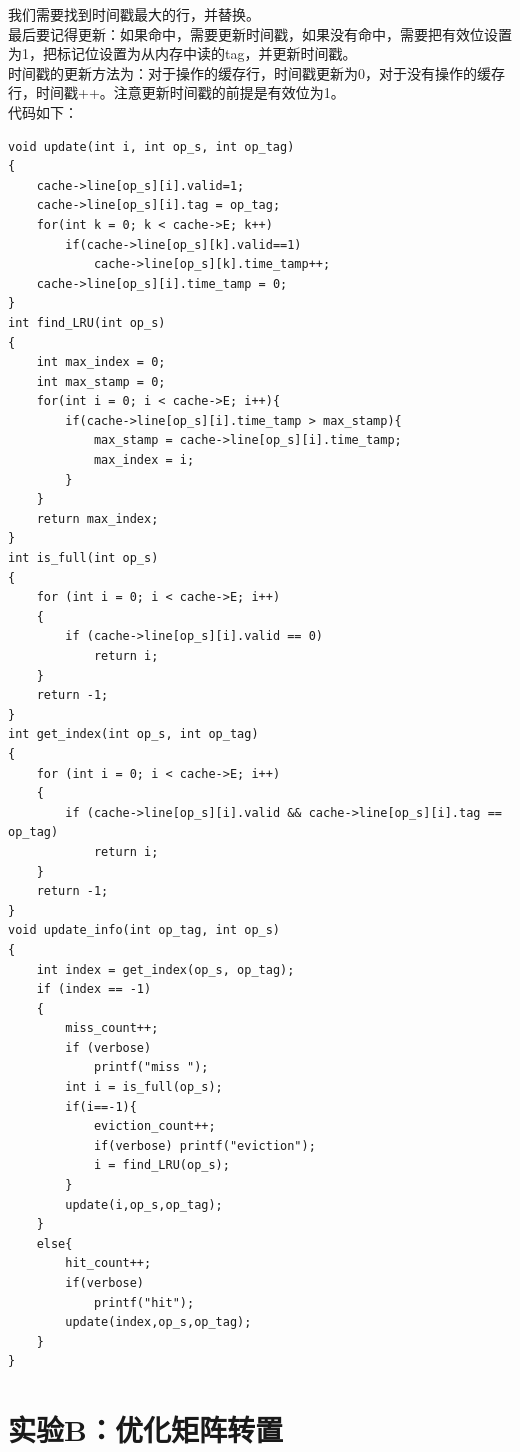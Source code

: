 \documentclass[12pt, a4paper, oneside]{ctexart}
\begin{document}
我们需要找到时间戳最大的行，并替换。\\
最后要记得更新：如果命中，需要更新时间戳，如果没有命中，需要把有效位设置为1，把标记位设置为从内存中读的tag，并更新时间戳。\\
时间戳的更新方法为：对于操作的缓存行，时间戳更新为0，对于没有操作的缓存行，时间戳++。注意更新时间戳的前提是有效位为1。\\
代码如下：
\begin{lstlisting}
void update(int i, int op_s, int op_tag)
{
    cache->line[op_s][i].valid=1;
    cache->line[op_s][i].tag = op_tag;
    for(int k = 0; k < cache->E; k++)
        if(cache->line[op_s][k].valid==1)
            cache->line[op_s][k].time_tamp++;
    cache->line[op_s][i].time_tamp = 0;
}
int find_LRU(int op_s)
{
    int max_index = 0;
    int max_stamp = 0;
    for(int i = 0; i < cache->E; i++){
        if(cache->line[op_s][i].time_tamp > max_stamp){
            max_stamp = cache->line[op_s][i].time_tamp;
            max_index = i;
        }
    }
    return max_index;
}
int is_full(int op_s)
{
    for (int i = 0; i < cache->E; i++)
    {
        if (cache->line[op_s][i].valid == 0)
            return i;
    }
    return -1;
}
int get_index(int op_s, int op_tag)
{
    for (int i = 0; i < cache->E; i++)
    {
        if (cache->line[op_s][i].valid && cache->line[op_s][i].tag == op_tag)
            return i;
    }
    return -1;
}
void update_info(int op_tag, int op_s)
{
    int index = get_index(op_s, op_tag);
    if (index == -1)
    {
        miss_count++;
        if (verbose)
            printf("miss ");
        int i = is_full(op_s);
        if(i==-1){
            eviction_count++;
            if(verbose) printf("eviction");
            i = find_LRU(op_s);
        }
        update(i,op_s,op_tag);
    }
    else{
        hit_count++;
        if(verbose)
            printf("hit");
        update(index,op_s,op_tag);    
    }
}
\end{lstlisting}
\section{实验B：优化矩阵转置}
\end{document}
